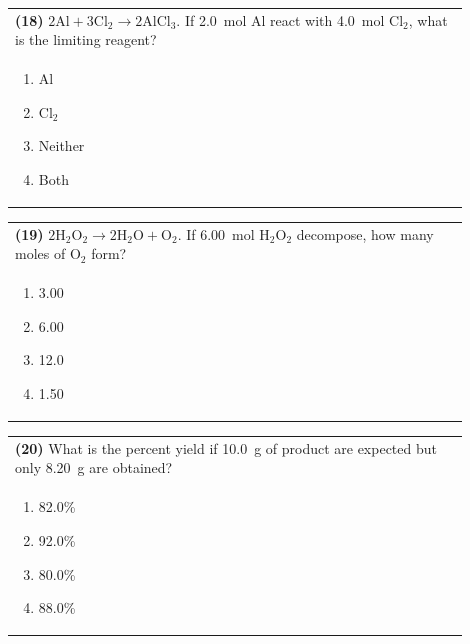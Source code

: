 \documentclass{article}
\begin{document}
\vspace{0.2cm}
\noindent\begin{tabular}{|p{0.9\linewidth}|}
\hline
\textbf{(18)} $2\text{Al} + 3\text{Cl}_2 \rightarrow 2\text{AlCl}_3$. If 2.0~mol Al react with 4.0~mol Cl$_2$, what is the limiting reagent?\\[0.2cm]

\begin{minipage}[t]{0.85\linewidth}
\begin{enumerate}[label=\alph*.]
\item Al
\item Cl$_2$
\item Neither
\item Both
\end{enumerate}
\end{minipage}\\[0.2cm]
\hline
\end{tabular}

\vspace{0.2cm}
\noindent\begin{tabular}{|p{0.9\linewidth}|}
\hline
\textbf{(19)} $2\text{H}_2\text{O}_2 \rightarrow 2\text{H}_2\text{O} + \text{O}_2$. If 6.00~mol H$_2$O$_2$ decompose, how many moles of O$_2$ form?\\[0.2cm]

\begin{minipage}[t]{0.85\linewidth}
\begin{enumerate}[label=\alph*.]
\item 3.00
\item 6.00
\item 12.0
\item 1.50
\end{enumerate}
\end{minipage}\\[0.2cm]
\hline
\end{tabular}

\vspace{0.2cm}
\noindent\begin{tabular}{|p{0.9\linewidth}|}
\hline
\textbf{(20)} What is the percent yield if 10.0~g of product are expected but only 8.20~g are obtained?\\[0.2cm]

\begin{minipage}[t]{0.85\linewidth}
\begin{enumerate}[label=\alph*.]
\item 82.0\%
\item 92.0\%
\item 80.0\%
\item 88.0\%
\end{enumerate}
\end{minipage}\\[0.2cm]
\hline
\end{tabular}
\end{document}
